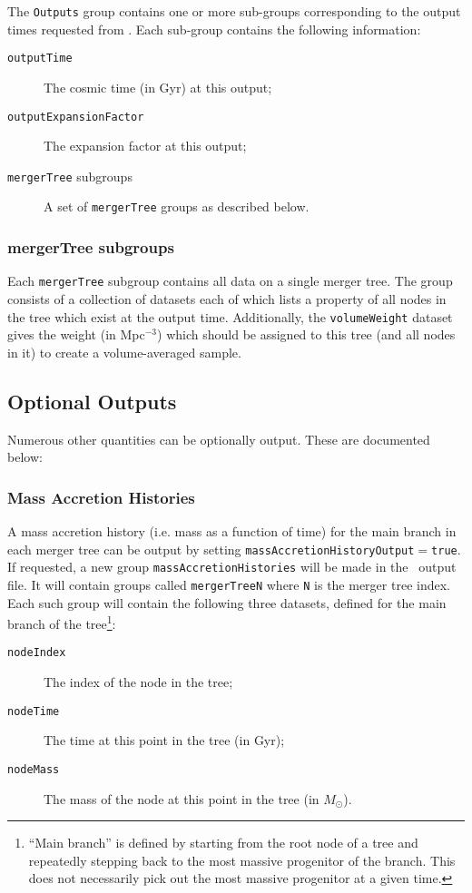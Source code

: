 The {\tt Outputs} group contains one or more sub-groups corresponding to the output times requested from \glc. Each sub-group contains the following information:
\begin{description}
 \item[{\tt outputTime}] The cosmic time (in Gyr) at this output;
 \item[{\tt outputExpansionFactor}] The expansion factor at this output;
 \item[{\tt mergerTree} subgroups] A set of {\tt mergerTree} groups as described below.
\end{description}

\subsubsection{mergerTree subgroups}

Each {\tt mergerTree} subgroup contains all data on a single merger tree. The group consists of a collection of datasets each of which lists a property of all nodes in the tree which exist at the output time. Additionally, the {\tt volumeWeight} dataset gives the weight (in Mpc$^{-3}$) which should be assigned to this tree (and all nodes in it) to create a volume-averaged sample.

\subsection{Optional Outputs}

Numerous other quantities can be optionally output. These are documented below:

\subsubsection{Mass Accretion Histories}

A mass accretion history (i.e. mass as a function of time) for the main branch in each merger tree can be output by setting {\tt massAccretionHistoryOutput}$=${\tt true}. If requested, a new group {\tt massAccretionHistories} will be made in the \glc\ output file. It will contain groups called {\tt mergerTreeN} where {\tt N} is the merger tree index. Each such group will contain the following three datasets, defined for the main branch of the tree\footnote{``Main branch'' is defined by starting from the root node of a tree and repeatedly stepping back to the most massive progenitor of the branch. This does not necessarily pick out the most massive progenitor at a given time.}:
\begin{description}
 \item [{\tt nodeIndex}] The index of the node in the tree;
 \item [{\tt nodeTime}] The time at this point in the tree (in Gyr);
 \item [{\tt nodeMass}] The mass of the node at this point in the tree (in $M_\odot$).
\end{description}


